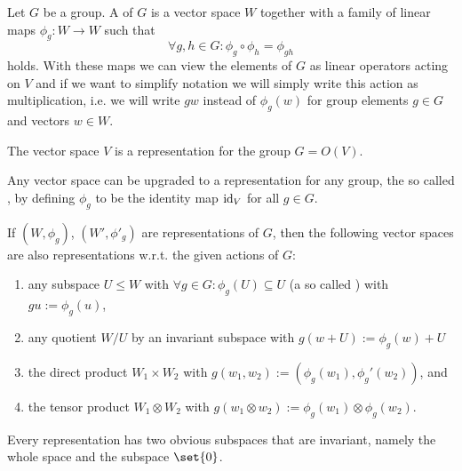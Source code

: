 
\begin{definition}
Let $G$ be a group. A  of $G$ is a vector space $W$ together with a family of linear maps $\phi_g: W\to W$ such that
\[\forall g,h\in G: \phi_g \circ \phi_h = \phi_{gh}\]
holds. With these maps we can view the elements of $G$ as linear operators acting on $V$ and if we want to simplify notation we will simply write this action as multiplication, i.e. we will write $gw$ instead of $\phi_g(w)$ for group elements $g\in G$ and vectors $w\in W$.
\end{definition}

\begin{example}
The vector space $V$ is a representation for the group $G=O(V)$.
\end{example}

\begin{example}
Any vector space can be upgraded to a representation for any group, the so called , by defining $\phi_g$ to be the identity map $\operatorname{id}_V$ for all $g\in G$.
\end{example}

\begin{theorem}
If $(W,\phi_g)$, $(W',\phi'_g)$ are representations of $G$, then the following vector spaces are also representations w.r.t. the given actions of $G$:
\begin{enumerate}
\item any subspace $U\leq W$ with $\forall g\in G: \phi_g(U) \subseteq U$ (a so called ) with $gu := \phi_g(u)$,
\item any quotient $W/U$ by an invariant subspace with $g(w+U) := \phi_g(w)+U$
\item the direct product $W_1\times W_2$ with $g(w_1,w_2) := (\phi_g(w_1),\phi_g'(w_2))$, and
\item the tensor product $W_1 \otimes W_2$ with $g(w_1\otimes w_2) := \phi_g(w_1)\otimes\phi_g(w_2)$.
\end{enumerate}
\end{theorem}

\begin{example}
Every representation has two obvious subspaces that are invariant, namely the whole space and the subspace $\set{0}$.
\end{example}


